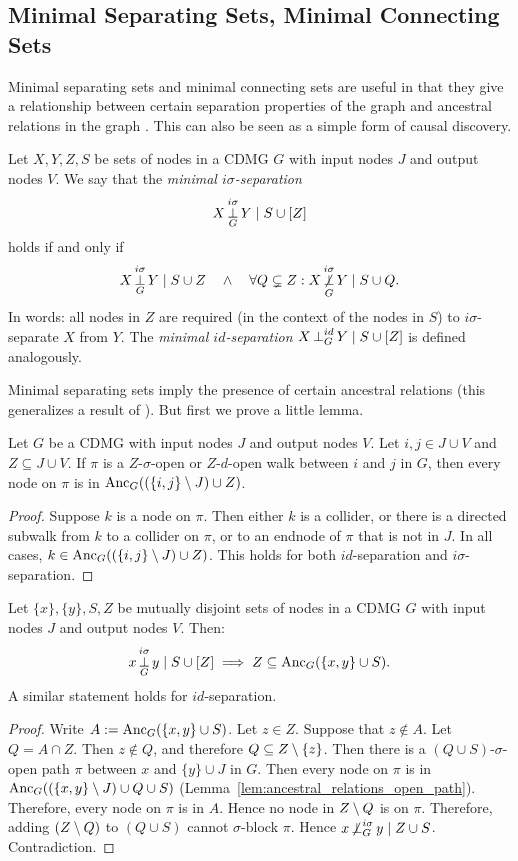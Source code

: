 \subsection{Minimal Separating Sets, Minimal Connecting Sets}

Minimal separating sets and minimal connecting sets are useful in that they give a relationship between
certain separation properties of the graph and ancestral relations in the graph \cite{SMR1999,ClaassenHeskes2011}.
This can also be seen as a simple form of causal discovery.

\begin{Def}\label{def:min_sep}
Let $X,Y,Z,S$ be sets of nodes in a CDMG $G$ with input nodes $J$ and output nodes $V$. 
We say that the \emph{minimal $i\sigma$-separation}
  $$X \operatorname*{\perp}^{i\sigma}_{G} Y \mid S \cup [Z]$$
holds if and only if
  $$X \operatorname*{\perp}^{i\sigma}_{G} Y \mid S \cup Z \quad\land\quad \forall Q \subsetneq Z: X \operatorname*{\not\perp}^{i\sigma}_G Y \mid S \cup Q.$$
In words: all nodes in $Z$ are required (in the context of the nodes in $S$) to $i\sigma$-separate $X$ from $Y$.
The \emph{minimal $id$-separation} $X \operatorname*{\perp}^{id}_{G} Y \mid S \cup [Z]$ is defined analogously.
\end{Def}

Minimal separating sets imply the presence of certain ancestral relations (this generalizes a result of \cite{SMR1999}).
But first we prove a little lemma.
\begin{Lem}\label{lem:ancestral_relations_open_path}
  Let $G$ be a CDMG with input nodes $J$ and output nodes $V$. Let $i, j \in J \cup V$ and $Z \subseteq J \cup V$.
  If $\pi$ is a $Z$-$\sigma$-open or $Z$-$d$-open walk between $i$ and $j$ in $G$, then every node on $\pi$ is in $\mathrm{Anc}_G((\{i,j\} \setminus J) \cup Z)$.
\end{Lem}
\begin{proof}
  Suppose $k$ is a node on $\pi$. 
  Then either $k$ is a collider, or there is a directed subwalk from $k$ to a collider on $\pi$, or to an endnode of $\pi$ that is not in $J$. 
  In all cases, $k \in \mathrm{Anc}_G((\{i,j\}\setminus J)\cup Z)$.
  This holds for both $id$-separation and $i\sigma$-separation.
\end{proof}
\begin{Prp}\label{prp:min_sep}
Let $\{x\},\{y\},S,Z$ be mutually disjoint sets of nodes in a CDMG $G$ with input nodes $J$ and output nodes $V$.
Then:
$$x \operatorname*{\perp}^{i\sigma}_G y \mid S \cup [Z] \implies Z \subseteq \mathrm{Anc}_{G}(\{x, y\} \cup S).$$
A similar statement holds for $id$-separation.
\end{Prp}
\begin{proof}
  Write $A := \mathrm{Anc}_G(\{x,y\} \cup S)$.
  Let $z \in Z$. 
  Suppose that $z \notin A$. 
  Let $Q = A \cap Z$.
  Then $z \notin Q$, and therefore $Q \subseteq Z \setminus \{z\}$.
  Then there is a $(Q \cup S)$-$\sigma$-open path $\pi$ between $x$ and $\{y\} \cup J$ in $G$.
  Then every node on $\pi$ is in $\mathrm{Anc}_G((\{x,y\} \setminus J) \cup Q \cup S)$ (Lemma~\ref{lem:ancestral_relations_open_path}).
  Therefore, every node on $\pi$ is in $A$.
  Hence no node in $Z \setminus Q$ is on $\pi$.
  Therefore, adding $(Z \setminus Q)$ to $(Q \cup S)$ cannot $\sigma$-block $\pi$.
  Hence $x \operatorname*{\not\perp}^{i\sigma}_G y \mid Z \cup S$. Contradiction.
\end{proof}

